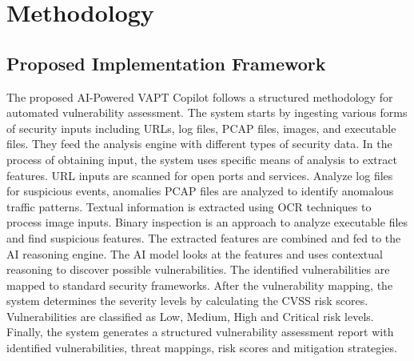 \documentclass[journal]{IEEEtran}
\begin{document}
\FloatBarrier


\section{Methodology}

\subsection{Proposed Implementation Framework}
The proposed AI-Powered VAPT Copilot follows a structured methodology for automated vulnerability assessment. The system starts by ingesting various forms of security inputs including URLs, log files, PCAP files, images, and executable files. They feed the analysis engine with different types of security data. In the process of obtaining input, the system uses specific means of analysis to extract features. URL inputs are scanned for open ports and services. Analyze log files for suspicious events, anomalies PCAP files are analyzed to identify anomalous traffic patterns. Textual information is extracted using OCR techniques to process image inputs. Binary inspection is an approach to analyze executable files and find suspicious features. The extracted features are combined and fed to the AI reasoning engine. The AI model looks at the features and uses contextual reasoning to discover possible vulnerabilities. The identified vulnerabilities are mapped to standard security frameworks. After the vulnerability mapping, the system determines the severity levels by calculating the CVSS risk scores. Vulnerabilities are classified as Low, Medium, High and Critical risk levels. Finally, the system generates a structured vulnerability assessment report with identified vulnerabilities, threat mappings, risk scores and mitigation strategies.

\end{document}
